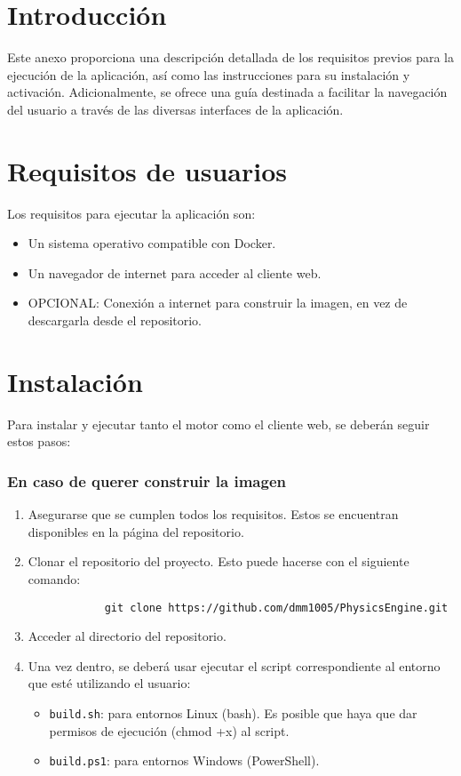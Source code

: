 \section{Introducción}
Este anexo proporciona una descripción detallada de los requisitos previos para la ejecución de la aplicación, así como las instrucciones para su instalación y activación. Adicionalmente, se ofrece una guía destinada a facilitar la navegación del usuario a través de las diversas interfaces de la aplicación.
\section{Requisitos de usuarios}
Los requisitos para ejecutar la aplicación son:
\begin{itemize}
    \item Un sistema operativo compatible con Docker.
    \item Un navegador de internet para acceder al cliente web.
    \item OPCIONAL: Conexión a internet para construir la imagen, en vez de descargarla desde el repositorio.
\end{itemize}
\section{Instalación}
Para instalar y ejecutar tanto el motor como el cliente web, se deberán seguir estos pasos:
\subsubsection{En caso de querer construir la imagen}
\begin{enumerate}
    \item Asegurarse que se cumplen todos los requisitos. Estos se encuentran disponibles en la página del repositorio.
    \item Clonar el repositorio del proyecto. Esto puede hacerse con el siguiente comando:
        \begin{verbatim}
            git clone https://github.com/dmm1005/PhysicsEngine.git
        \end{verbatim}
    \item Acceder al directorio del repositorio.
    \item Una vez dentro, se deberá usar ejecutar el script correspondiente al entorno que esté utilizando el usuario:
    \begin{itemize}
        \item \texttt{build.sh}: para entornos Linux (bash). Es posible que haya que dar permisos de ejecución (chmod +x) al script.
        \item \texttt{build.ps1}: para entornos Windows (PowerShell).
    \end{itemize}
\end{enumerate}
